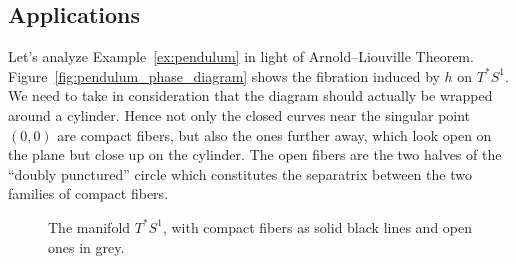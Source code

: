 \documentclass[main.tex]{subfiles}
\begin{document}
\subsection{Applications}
\begin{example}
	Let's analyze Example~\ref{ex:pendulum} in light of Arnold--Liouville Theorem. Figure~\ref{fig:pendulum_phase_diagram} shows the fibration induced by $h$ on $T^*S^1$. We need to take in consideration that the diagram should actually be wrapped around a cylinder. Hence not only the closed curves near the singular point $(0, 0)$ are compact fibers, but also the ones further away, which look open on the plane but close up on the cylinder. The open fibers are the two halves of the ``doubly punctured'' circle which constitutes the separatrix between the two families of compact fibers.

	\begin{figure}[H]
		\centering
		\caption{The manifold $T^* S^1$, with compact fibers as solid black lines and open ones in grey.}
	\end{figure}
\end{example}
\end{document}
